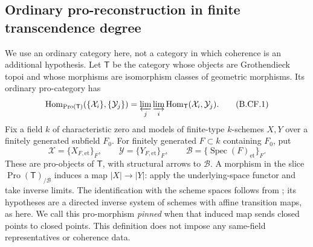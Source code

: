 \subsection{Ordinary pro-reconstruction in finite transcendence degree}

We use an ordinary category here, not a category in which coherence is an
additional hypothesis. Let \(\mathsf T\) be the category whose objects are
Grothendieck topoi and whose morphisms are isomorphism classes of geometric
morphisms. Its ordinary pro-category has
\[
 \operatorname{Hom}_{\operatorname{Pro}(\mathsf T)}
       (\{\mathcal X_i\},\{\mathcal Y_j\})
   =\varprojlim_j\varinjlim_i
       \operatorname{Hom}_{\mathsf T}(\mathcal X_i,\mathcal Y_j).
                                                        \tag{B.CF.1}
\]
Fix a field \(k\) of characteristic zero and models of finite-type
\(k\)-schemes \(X,Y\) over a finitely generated subfield \(F_0\).
For finitely generated \(F\subset k\) containing \(F_0\), put
\[
 \mathcal X=\{X_{F,\mathrm{et}}\}_F,
 \qquad \mathcal Y=\{Y_{F,\mathrm{et}}\}_F,
 \qquad \mathcal B=\{\operatorname{Spec}(F)_{\mathrm{et}}\}_F.
\]
These are pro-objects of \(\mathsf T\), with structural arrows to
\(\mathcal B\). A morphism in the slice
\(\operatorname{Pro}(\mathsf T)_{/\mathcal B}\) induces a map
\(|X|\to |Y|\): apply the underlying-space functor and take inverse
limits. The identification with the scheme spaces follows from
\citep[Lemma~32.4.2, Tag~0CUF]{StacksProject}; its hypotheses are a directed
inverse system of schemes with affine transition maps, as here.
We call this pro-morphism \emph{pinned} when that induced map sends
closed points to closed points. This definition does not impose any
same-field representatives or coherence data.

